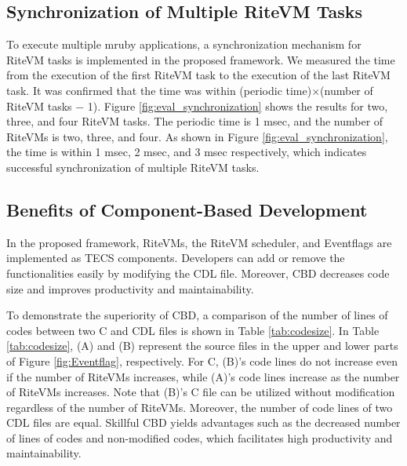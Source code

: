 \documentclass{sig-alternate-05-2015}
\begin{document}
\subsection{Synchronization of Multiple RiteVM Tasks}
To execute multiple mruby applications, a synchronization mechanism for RiteVM tasks is implemented in the proposed framework.
We measured the time from the execution of the first RiteVM task to the execution of the last RiteVM task.
It was confirmed that the time was within (periodic time)$\times$(number of RiteVM tasks $-$ 1).
Figure \ref{fig:eval_synchronization} shows the results for two, three, and four RiteVM tasks.
The periodic time is 1 msec, and the number of RiteVMs is two, three, and four.
As shown in Figure \ref{fig:eval_synchronization}, the time is within 1 msec, 2 msec, and 3 msec respectively, which indicates successful synchronization of multiple RiteVM tasks.




\subsection{Benefits of Component-Based Development}
In the proposed framework, RiteVMs, the RiteVM scheduler, and Eventflags are implemented as TECS components.
Developers can add or remove the functionalities easily by modifying the CDL file.
Moreover, CBD decreases code size and improves productivity and maintainability.

To demonstrate the superiority of CBD, a comparison of the number of lines of codes between two C and CDL files is shown in Table \ref{tab:codesize}.
In Table \ref{tab:codesize}, (A) and (B) represent the source files in the upper and lower parts of Figure \ref{fig:Eventflag}, respectively. 
For C, (B)'s code lines do not increase even if the number of RiteVMs increases, while (A)'s code lines increase as the number of RiteVMs increases.
Note that (B)'s C file can be utilized without modification regardless of the number of RiteVMs.
Moreover, the number of code lines of two CDL files are equal.
Skillful CBD yields advantages such as the decreased number of lines of codes and non-modified codes, which facilitates high productivity and maintainability.
\end{document}
